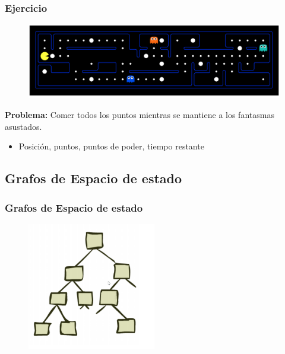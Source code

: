 \documentclass[10pt]{beamer}
\begin{document}
\begin{frame}
  \frametitle{Ejercicio}

  \begin{figure}[!h] 
    \centering
    \includegraphics[width=\textwidth]{img/completo1}
  \end{figure}
  \textbf{Problema:} Comer todos los puntos mientras se mantiene a los fantasmas asustados.
  \pause
  \begin{itemize}
    \item Posición, puntos, puntos de poder, tiempo restante
  \end{itemize}
\end{frame}


\subsection{Grafos de Espacio de estado}

\begin{frame}
  \frametitle{Grafos de Espacio de estado}

  \begin{figure}[!h] 
    \centering
    \includegraphics[width=0.5\textwidth]{img/grafo1}
  \end{figure}

\end{frame}
\end{document}
